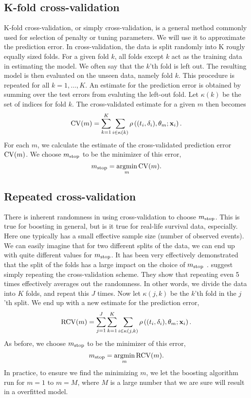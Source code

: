 \subsection{K-fold cross-validation}
K-fold cross-validation, or simply cross-validation, is a general method commonly used for selection of penalty or tuning parameters. We will use it to approximate the prediction error. In cross-validation, the data is split randomly into K rougly equally sized folds. For a given fold $k$, all folds except $k$ act as the training data in estimating the model. We often say that the $k$'th fold is left out. The resulting model is then evaluated on the unseen data, namely fold $k$. This procedure is repeated for all $k=1,\ldots,K$. An estimate for the prediction error is obtained by summing over the test errors from evaluting the left-out fold. Let $\kappa(k)$ be the set of indices for fold $k$. The cross-validated estimate for a given $m$ then becomes
\begin{equation}
    \operatorname{CV}(m)=\sum_{k=1}^K\sum_{i\in\kappa(k)}\rho\left((t_i,\delta_i),\theta_m;\mathbf{x}_i\right).
\end{equation}
For each $m$, we calculate the estimate of the cross-validated prediction error $\operatorname{CV}(m)$. We choose $m_{\text{stop}}$ to be the minimizer of this error,
\begin{equation}
    m_{\text{stop}}=\operatorname*{argmin}_{m}\operatorname{CV}(m).
\end{equation}

\subsection{Repeated cross-validation}
There is inherent randomness in using cross-validation to choose $m_{\text{stop}}$. This is true for boosting in general, but is it true for real-life survival data, especially.
Here one typically has a small effective sample size (number of observed events). We can easily imagine that for two different splits of the data, we can end up with quite different values for $m_{\text{stop}}$.
It has been very effectively demonstrated that the split of the folds has a large impact on the choice of $m_{\text{stop}}$ \citep{seibold}. \citet{seibold} suggest simply repeating the cross-validation scheme. They show that repeating even 5 times effectively averages out the randomness.  In other words, we divide the data into $K$ folds, and repeat this $J$ times. Now let $\kappa(j, k)$ be the $k$'th fold in the $j$'th split. We end up with a new estimate for the prediction error,
\begin{equation}
    \operatorname{RCV}(m)=\sum_{j=1}^J\sum_{k=1}^K\sum_{i\in\kappa(j,k)}\rho\left((t_i,\delta_i),\theta_m;\mathbf{x}_i\right).
\end{equation}
As before, we choose $m_{\text{stop}}$ to be the minimizer of this error,
\begin{equation}
    m_{\text{stop}}=\operatorname*{argmin}_{m}\operatorname{RCV}(m).
\end{equation}
In practice, to ensure we find the minimizing $m$, we let the boosting algorithm run for $m=1$ to $m=M$, where $M$ is a large number that we are sure will result in a overfitted model.